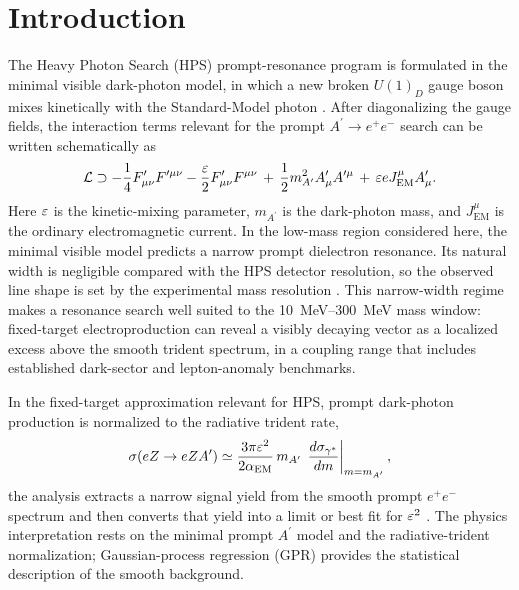 \section{Introduction}
\label{sec:introduction}

The Heavy Photon Search (HPS) prompt-resonance program is formulated in the minimal
visible dark-photon model, in which a new broken $U(1)_D$ gauge boson mixes
kinetically with the Standard-Model photon \cite{Holdom1986,EssigEtAl2011}. After
diagonalizing the gauge fields, the interaction terms relevant for the prompt
$A^\prime \rightarrow e^+e^-$ search can be written schematically as
\begin{equation}
\mathcal{L}
\supset
-\frac{1}{4}F_{\mu\nu}^{\prime}F^{\prime\mu\nu}
-\frac{\varepsilon}{2}F_{\mu\nu}^{\prime}F^{\mu\nu}
\,+\,\frac{1}{2}m_{A^\prime}^{2}A_\mu^\prime A^{\prime\mu}
\,+\,\varepsilon e J_{\mathrm{EM}}^\mu A_\mu^\prime .
\label{eq:dark-photon-lagrangian}
\end{equation}
Here $\varepsilon$ is the kinetic-mixing parameter, $m_{A^\prime}$ is the dark-photon mass,
and $J_{\mathrm{EM}}^\mu$ is the ordinary electromagnetic current. In the low-mass
region considered here, the minimal visible model predicts a narrow prompt dielectron
resonance. Its natural width is negligible compared with the HPS detector resolution,
so the observed line shape is set by the experimental mass resolution
\cite{HPS2015DarkPhoton,HPS2016PromptLong}. This narrow-width regime makes a resonance
search well suited to the \SIrange{10}{300}{MeV} mass window: fixed-target
electroproduction can reveal a visibly decaying vector as a localized excess above the
smooth trident spectrum, in a coupling range that includes established dark-sector and
lepton-anomaly benchmarks.

In the fixed-target approximation relevant for HPS, prompt dark-photon production is
normalized to the radiative trident rate,
\begin{equation}
\sigma(e Z \rightarrow e Z A^\prime)
\simeq
\frac{3\pi \varepsilon^2}{2\alpha_{\mathrm{EM}}}\,
m_{A^\prime}\,
\left.\frac{d\sigma_{\gamma^\ast}}{dm}\right|_{m=m_{A^\prime}},
\label{eq:ap-production}
\end{equation}
the analysis extracts a narrow signal yield from the smooth prompt $e^+e^-$ spectrum
and then converts that yield into a limit or best fit for $\varepsilon^2$
\cite{EssigEtAl2011,HPS2015DarkPhoton,HPS2016PromptLong}. The physics interpretation
rests on the minimal prompt $A^\prime$ model and the radiative-trident normalization;
Gaussian-process regression (GPR) provides the statistical description of the smooth
background.

